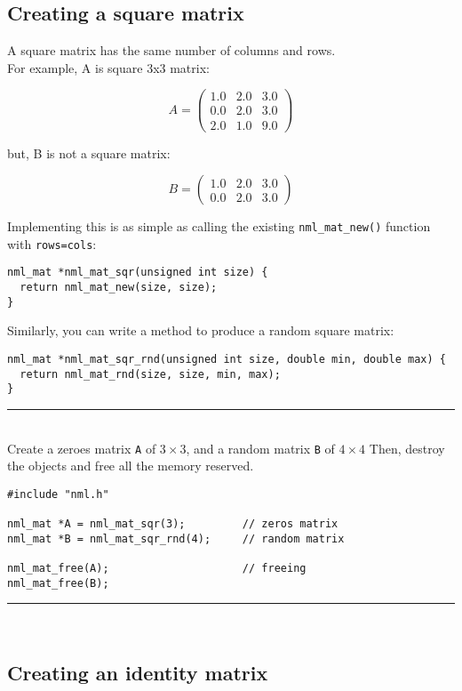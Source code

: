 \subsection{Creating a square matrix}

A square matrix has the same number of columns and rows.
\\

For example, A is square 3x3 matrix:

$$
A = \left( \begin{array}{rrr}
1.0 & 2.0 & 3.0 \\
0.0 & 2.0 & 3.0 \\
2.0 & 1.0 & 9.0
\end{array} \right)
$$

but, B is not a square matrix:

$$
B
= \left( \begin{array}{rrr}
1.0 & 2.0 & 3.0 \\
0.0 & 2.0 & 3.0
\end{array} \right)
$$

Implementing this is as simple as calling the existing {\tt nml\_mat\_new()} function with {\tt rows=cols}:

\begin{verbatim}
nml_mat *nml_mat_sqr(unsigned int size) {
  return nml_mat_new(size, size);
}
\end{verbatim}

Similarly, you can write a method to produce a random square matrix:
\begin{verbatim}
nml_mat *nml_mat_sqr_rnd(unsigned int size, double min, double max) {
  return nml_mat_rnd(size, size, min, max);
} 
\end{verbatim}

\rule{\textwidth}{0.5pt}\\
\example \textsf{Create a zeroes matrix {\tt A} of $3\times 3$, and a random matrix {\tt B} of $4\times 4$ Then, destroy the objects and free all the memory reserved.}

\begin{verbatim}
#include "nml.h"

nml_mat *A = nml_mat_sqr(3);         // zeros matrix
nml_mat *B = nml_mat_sqr_rnd(4);     // random matrix

nml_mat_free(A);                     // freeing
nml_mat_free(B);
\end{verbatim}
\rule{\textwidth}{0.5pt}\\

\subsection{Creating an identity matrix}

